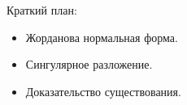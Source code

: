 
\begin{frame} %


\end{frame}



\begin{frame}{Краткий план:}
  \begin{itemize}[<+->]
    \item Жорданова нормальная форма.
    \item Сингулярное разложение.
    \item Доказательство существования.
  \end{itemize}

\end{frame}


